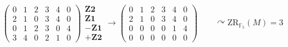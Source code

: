 \documentclass[a4paper, 12pt]{scrartcl}
\begin{document}
\begin{gather*}
	\begin{pmatrix}
		0 & 1 & 2 & 3 & 4 & 0 \\
		2 & 1 & 0 & 3 & 4 & 0 \\
		0 & 1 & 2 & 3 & 0 & 4 \\
		3 & 4 & 0 & 2 & 1 & 0
	\end{pmatrix}
	\begin{matrix}
		\mathbf{Z2}\\\mathbf{Z1}\\-\mathbf{Z1}\\+\mathbf{Z2}
	\end{matrix} \rightarrow
	\begin{pmatrix}
		0 & 1 & 2 & 3 & 4 & 0 \\
		2 & 1 & 0 & 3 & 4 & 0 \\
		0 & 0 & 0 & 0 & 1 & 4 \\
		0 & 0 & 0 & 0 & 0 & 0
	\end{pmatrix} \qquad \curvearrowright \mathrm{ZR}_{\mathbb{F}_5}(M) = 3
\end{gather*}
\end{document}
